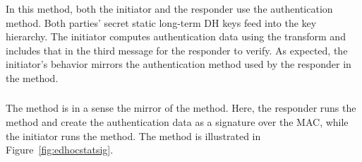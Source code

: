 \subsubsection{\mStatStat}
In this method, both the initiator and the responder use the \mStat{}
authentication method.
%
Both parties' secret static long-term DH keys feed into the key hierarchy.
%
The initiator computes authentication data using the \mAead{} transform
and includes that in the third message for the responder to verify.
%
As expected, the initiator's behavior mirrors the \mStat{} authentication method used by the responder in the \mSigStat{} method.
%

\subsubsection{\mStatSig}
The \mStatSig{} method is in a sense the mirror of the \mSigStat{} method.
%
Here, the responder runs the \mSig{} method and create the \mAuthr{}
authentication data as a signature over the MAC, while the initiator runs the \mStat{} method.
%
The method is illustrated in Figure~\ref{fig:edhocstatsig}.
%

